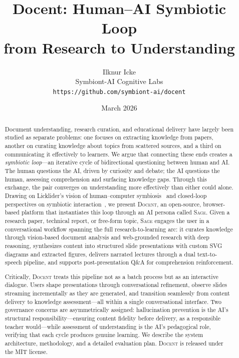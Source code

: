 \documentclass[11pt,a4paper]{article}
\title{%
  \textbf{Docent: Human--AI Symbiotic Loop\\
  from Research to Understanding}%
}
\author{%
  Ilknur Icke\\
  Symbiont-AI Cognitive Labs\\
  \texttt{https://github.com/symbiont-ai/docent}
}
\date{March 2026}
\newcommand{\system}{\textsc{Docent}\xspace}
\newcommand{\sage}{\textsc{Sage}\xspace}
\begin{document}
\maketitle

\begin{abstract}
Document understanding, research curation, and educational delivery have largely been studied as separate problems: one focuses on extracting knowledge from papers, another on curating knowledge about topics from scattered sources, and a third on communicating it effectively to learners.
We argue that connecting these ends creates a \emph{symbiotic loop}---an iterative cycle of bidirectional questioning between human and AI.
The human questions the AI, driven by curiosity and debate; the AI questions the human, assessing comprehension and surfacing knowledge gaps.
Through this exchange, the pair converges on understanding more effectively than either could alone.
Drawing on Licklider's vision of human--computer symbiosis~\citep{licklider1960symbiosis} and closed-loop perspectives on symbiotic interaction~\citep{fairclough2015closedloop}, we present \system, an open-source, browser-based platform that instantiates this loop through an AI persona called \sage.
Given a research paper, technical report, or free-form topic, \sage engages the user in a conversational workflow spanning the full research-to-learning arc: it curates knowledge through vision-based document analysis and web-grounded research with deep reasoning, synthesizes content into structured slide presentations with custom SVG diagrams and extracted figures, delivers narrated lectures through a dual text-to-speech pipeline, and supports post-presentation Q\&A for comprehension reinforcement.

Critically, \system treats this pipeline not as a batch process but as an interactive dialogue.
Users shape presentations through conversational refinement, observe slides streaming incrementally as they are generated, and transition seamlessly from content delivery to knowledge assessment---all within a single conversational interface.
Two governance concerns are asymmetrically assigned: hallucination prevention is the AI's structural responsibility---ensuring content fidelity before delivery, as a responsible teacher would---while assessment of understanding is the AI's pedagogical role, verifying that each cycle produces genuine learning.
We describe the system architecture, methodology, and a detailed evaluation plan.
\system is released under the MIT license.
\end{abstract}
\end{document}
